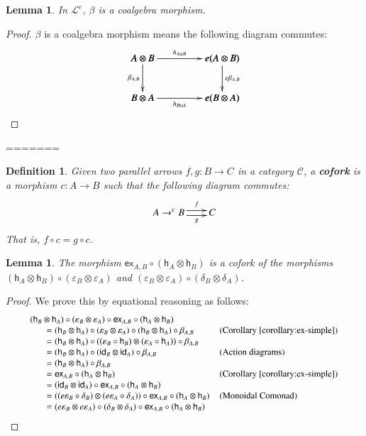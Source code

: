 \documentclass{article}
\newtheorem{lemma}[theorem]{Lemma}
\newtheorem{definition}[theorem]{Definition}
\let\mto\to
\let\to\relax
\newcommand{\to}{\rightarrow}
\newcommand{\cat}[1]{\mathcal{#1}}
\newcommand{\id}[0]{\mathsf{id}}
\newcommand{\e}[1]{\mathsf{ex}_{#1}}
\newcommand{\h}[1]{\mathsf{h}_{#1}}
\begin{document}
\begin{lemma}
  \label{lemma:beta-coalgebra-morph}
  In $\cat{L}^e$, $\beta$ is a coalgebra morphism.
\end{lemma}
\begin{proof}
  $\beta$ is a coalgebra morphism means the following diagram commutes:
  \[
  \bfig
    \square<800,400>[
      A\otimes B`
      e(A\otimes B)`
      B\otimes A`
      e(B\otimes A);
      h_{A\otimes B}`
      \beta_{A,B}`
      e\beta_{A,B}`
      h_{B\otimes A}]
  \efig
  \]
\end{proof}
=======
\begin{definition}
  \label{def:cofork}
  Given two parallel arrows $f,g : B \mto C$ in a category $\cat{C}$,
  a \textbf{cofork} is a morphism $c : A \mto B$ such that
  the following diagram commutes:
  \[
  A \mto^c B \two^f_g C
  \]
  That is, $f \circ c = g \circ c$.
\end{definition}

\begin{lemma}
  \label{lemma:cofork-for-ex}
  The morphism $\e{A,B} \circ (\h{A} \otimes \h{B})$ is a cofork of
  the morphisms $(\h{A} \otimes \h{B}) \circ (\varepsilon_B \otimes
  \varepsilon_A)$ and $(\varepsilon_B \otimes \varepsilon_A) \circ
  (\delta_B \otimes \delta_A)$.
\end{lemma}
\begin{proof}
  We prove this by equational reasoning as follows:
  \[
  \small
  \begin{array}{lll}
    (\h{B} \otimes \h{A}) \circ (\varepsilon_B \otimes \varepsilon_A) \circ \e{A,B} \circ (\h{A} \otimes \h{B})
    \\\,\,\,\,\,\,\,\,\,\,\,
    = (\h{B} \otimes \h{A}) \circ (\varepsilon_B \otimes \varepsilon_A) \circ (\h{B} \otimes \h{A}) \circ \beta_{A,B}
    & \text{(Corollary~\ref{corollary:ex-simple})}\\
    \,\,\,\,\,\,\,\,\,\,\,= (\h{B} \otimes \h{A}) \circ ((\varepsilon_B \circ \h{B}) \otimes (\varepsilon_A \circ \h{A})) \circ \beta_{A,B}
    & \text{}\\
    \,\,\,\,\,\,\,\,\,\,\,= (\h{B} \otimes \h{A}) \circ (\id_B \otimes \id_A) \circ \beta_{A,B}
    & \text{(Action diagrams)}\\
    \,\,\,\,\,\,\,\,\,\,\,= (\h{B} \otimes \h{A}) \circ \beta_{A,B}
    & \text{}\\
    \,\,\,\,\,\,\,\,\,\,\,= \e{A,B} \circ (\h{A} \otimes \h{B})
    & \text{(Corollary~\ref{corollary:ex-simple})}\\
    \,\,\,\,\,\,\,\,\,\,\,= (\id_B \otimes \id_A) \circ \e{A,B} \circ (\h{A} \otimes \h{B})
    & \text{}\\
    \,\,\,\,\,\,\,\,\,\,\,= ((e\varepsilon_B \circ \delta_B) \otimes (e\varepsilon_A \circ \delta_A)) \circ \e{A,B} \circ (\h{A} \otimes \h{B})
    & \text{(Monoidal Comonad)}\\
    \,\,\,\,\,\,\,\,\,\,\,= (e\varepsilon_B \otimes e\varepsilon_A) \circ (\delta_B \otimes \delta_A) \circ \e{A,B} \circ (\h{A} \otimes \h{B})
    & \text{}\\
  \end{array}
  \]
\end{proof}
\end{document}

